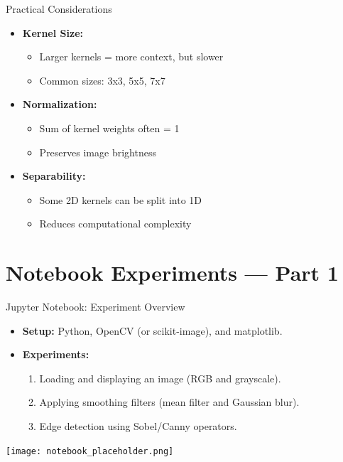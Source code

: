\documentclass{beamer}
\begin{document}
\begin{frame}{Practical Considerations}
  \begin{itemize}
    \item \textbf{Kernel Size:}
      \begin{itemize}
        \item Larger kernels = more context, but slower
        \item Common sizes: 3x3, 5x5, 7x7
      \end{itemize}
    \item \textbf{Normalization:}
      \begin{itemize}
        \item Sum of kernel weights often = 1
        \item Preserves image brightness
      \end{itemize}
    \item \textbf{Separability:}
      \begin{itemize}
        \item Some 2D kernels can be split into 1D
        \item Reduces computational complexity
      \end{itemize}
  \end{itemize}
\end{frame}

\section{Notebook Experiments --- Part 1}

\begin{frame}{Jupyter Notebook: Experiment Overview}
  \begin{itemize}
    \item \textbf{Setup:} Python, OpenCV (or scikit-image), and matplotlib.
    \item \textbf{Experiments:}
      \begin{enumerate}
        \item Loading and displaying an image (RGB and grayscale).
        \item Applying smoothing filters (mean filter and Gaussian blur).
        \item Edge detection using Sobel/Canny operators.
      \end{enumerate}
  \end{itemize}
  \begin{center}
    \texttt{[image: notebook\_placeholder.png]} %
  \end{center}
\end{frame}
\end{document}
